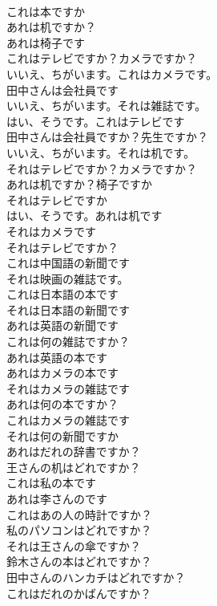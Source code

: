 \documentclass[8pt]{extreport}
\begin{document}
\begin{CJK}{UTF8}{min}
\\	これは本ですか	
\\	あれは机ですか？	
\\	あれは椅子です	
\\	これはテレビですか？カメラですか？	
\\	いいえ、ちがいます。これはカメラです。	
\\	田中さんは会社員です	
\\	いいえ、ちがいます。それは雑誌です。	
\\	はい、そうです。これはテレビです	
\\	田中さんは会社員ですか？先生ですか？	
\\	いいえ、ちがいます。それは机です。	
\\	それはテレビですか？カメラですか？	
\\	あれは机ですか？椅子ですか	
\\	それはテレビですか	
\\	はい、そうです。あれは机です	
\\	それはカメラです	
\\	それはテレビですか？	
\\	これは中国語の新聞です	
\\	それは映画の雑誌です。	
\\	これは日本語の本です	
\\	それは日本語の新聞です	
\\	あれは英語の新聞です	
\\	これは何の雑誌ですか？	
\\	あれは英語の本です	
\\	あれはカメラの本です	
\\	それはカメラの雑誌です	
\\	あれは何の本ですか？	
\\	これはカメラの雑誌です	
\\	それは何の新聞ですか	
\\	あれはだれの辞書ですか？	
\\	王さんの机はどれですか？	
\\	これは私の本です	
\\	あれは李さんのです	
\\	これはあの人の時計ですか？	
\\	私のパソコンはどれですか？	
\\	それは王さんの傘ですか？	
\\	鈴木さんの本はどれですか？	
\\	田中さんのハンカチはどれですか？	
\\	これはだれのかばんですか？	

\end{CJK}
\end{document}
